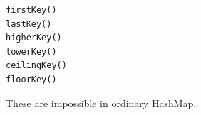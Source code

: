 \documentclass[11pt,a4paper]{book}
\begin{document}
\begin{verbatim} 
firstKey()
lastKey()
higherKey()
lowerKey()
ceilingKey()
floorKey()
\end{verbatim}


These are impossible in
ordinary HashMap.























\end{document}
